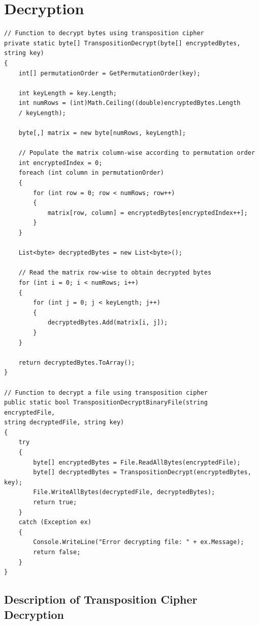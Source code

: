 \documentclass[a4paper,oneside,11pt]{book}
\begin{document}
\section{Decryption}
\begin{lstlisting}[language=Csh, caption={Code for Transposition Cipher Decryption}]
// Function to decrypt bytes using transposition cipher
private static byte[] TranspositionDecrypt(byte[] encryptedBytes, 
string key)
{
    int[] permutationOrder = GetPermutationOrder(key);

    int keyLength = key.Length;
    int numRows = (int)Math.Ceiling((double)encryptedBytes.Length 
    / keyLength);

    byte[,] matrix = new byte[numRows, keyLength];

    // Populate the matrix column-wise according to permutation order
    int encryptedIndex = 0;
    foreach (int column in permutationOrder)
    {
        for (int row = 0; row < numRows; row++)
        {
            matrix[row, column] = encryptedBytes[encryptedIndex++];
        }
    }

    List<byte> decryptedBytes = new List<byte>();

    // Read the matrix row-wise to obtain decrypted bytes
    for (int i = 0; i < numRows; i++)
    {
        for (int j = 0; j < keyLength; j++)
        {
            decryptedBytes.Add(matrix[i, j]);
        }
    }

    return decryptedBytes.ToArray();
}

// Function to decrypt a file using transposition cipher
public static bool TranspositionDecryptBinaryFile(string encryptedFile, 
string decryptedFile, string key)
{
    try
    {
        byte[] encryptedBytes = File.ReadAllBytes(encryptedFile);
        byte[] decryptedBytes = TranspositionDecrypt(encryptedBytes, key);
        File.WriteAllBytes(decryptedFile, decryptedBytes);
        return true;
    }
    catch (Exception ex)
    {
        Console.WriteLine("Error decrypting file: " + ex.Message);
        return false;
    }
}
\end{lstlisting}

\subsection{Description of Transposition Cipher Decryption}
\end{document}
